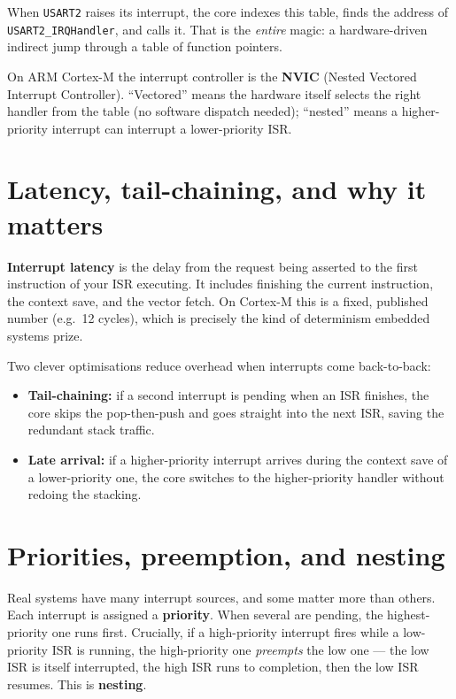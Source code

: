\documentclass[11pt,a4paper,oneside]{book}
\newcommand{\code}[1]{\texttt{#1}}
\begin{document}
When \code{USART2} raises its interrupt, the core indexes this table, finds the
address of \code{USART2\_IRQHandler}, and calls it. That is the \emph{entire}
magic: a hardware-driven indirect jump through a table of function pointers.

\begin{note}
On ARM Cortex-M the interrupt controller is the \textbf{NVIC} (Nested Vectored
Interrupt Controller). ``Vectored'' means the hardware itself selects the right
handler from the table (no software dispatch needed); ``nested'' means a
higher-priority interrupt can interrupt a lower-priority ISR.
\end{note}

\section{Latency, tail-chaining, and why it matters}

\textbf{Interrupt latency} is the delay from the request being asserted to the
first instruction of your ISR executing. It includes finishing the current
instruction, the context save, and the vector fetch. On Cortex-M this is a
fixed, published number (e.g.\ 12 cycles), which is precisely the kind of
determinism embedded systems prize.

Two clever optimisations reduce overhead when interrupts come back-to-back:
\begin{itemize}[leftmargin=1.4cm]
  \item \textbf{Tail-chaining:} if a second interrupt is pending when an ISR
        finishes, the core skips the pop-then-push and goes straight into the
        next ISR, saving the redundant stack traffic.
  \item \textbf{Late arrival:} if a higher-priority interrupt arrives during the
        context save of a lower-priority one, the core switches to the
        higher-priority handler without redoing the stacking.
\end{itemize}

\section{Priorities, preemption, and nesting}

Real systems have many interrupt sources, and some matter more than others.
Each interrupt is assigned a \textbf{priority}. When several are pending, the
highest-priority one runs first. Crucially, if a high-priority interrupt fires
while a low-priority ISR is running, the high-priority one \emph{preempts} the
low one --- the low ISR is itself interrupted, the high ISR runs to completion,
then the low ISR resumes. This is \textbf{nesting}.
\end{document}
